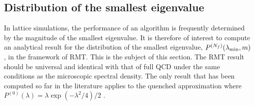 \subsection{Distribution of the smallest eigenvalue}
\label{sec32}

In lattice simulations, the performance of an algorithm is frequently
determined by the magnitude of the smallest eigenvalue.  It is
therefore of interest to compute an analytical result for the
distribution of the smallest eigenvalue, $P^{(N_f)}(\lambda_{\rm
  min},m)$, in the framework of RMT.  This is the subject of this
section.  The RMT result should be universal and identical with that
of full QCD under the same conditions as the microscopic spectral
density.  The only result that has been computed so far in the
literature applies to the quenched approximation where
$P^{(0)}(\lambda)=\lambda\exp(-\lambda^2/4)/2$ \cite{Forr93}.

